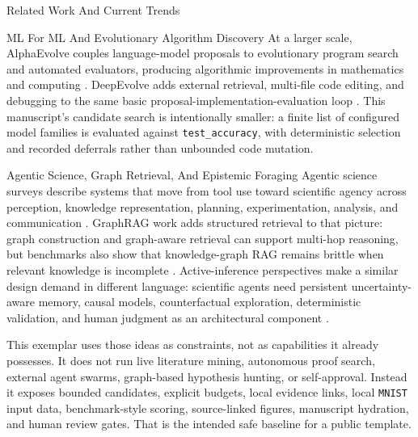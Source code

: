 \documentclass[
  ignorenonframetext,
]{beamer}
\begin{document}
\begin{frame}{Related Work And Current Trends}
\begin{block}{ML For ML And Evolutionary Algorithm Discovery}
At a larger scale, AlphaEvolve couples language-model proposals to
evolutionary program search and automated evaluators, producing
algorithmic improvements in mathematics and computing
. DeepEvolve adds external
retrieval, multi-file code editing, and debugging to the same basic
proposal-implementation-evaluation loop \breakseq{[@deepevolve\_2025]}. This
manuscript's candidate search is intentionally smaller: a finite list of
configured model families is evaluated against \texttt{test\_accuracy},
with deterministic selection and recorded deferrals rather than
unbounded code mutation.
\end{block}

\begin{block}{Agentic Science, Graph Retrieval, And Epistemic Foraging}
\protect{}\label{sec:agentic-science-graph-retrieval}
Agentic science surveys describe systems that move from tool use toward
scientific agency across perception, knowledge representation, planning,
experimentation, analysis, and communication
.
GraphRAG work adds structured retrieval to that picture: graph
construction and graph-aware retrieval can support multi-hop reasoning,
but benchmarks also show that knowledge-graph RAG remains brittle when
relevant knowledge is incomplete . Active-inference perspectives make a similar
design demand in different language: scientific agents need persistent
uncertainty-aware memory, causal models, counterfactual exploration,
deterministic validation, and human judgment as an architectural
component .

This exemplar uses those ideas as constraints, not as capabilities it
already possesses. It does not run live literature mining, autonomous
proof search, external agent swarms, graph-based hypothesis hunting, or
self-approval. Instead it exposes bounded candidates, explicit budgets,
local evidence links, local \texttt{MNIST} input data, benchmark-style
scoring, source-linked figures, manuscript hydration, and human review
gates. That is the intended safe baseline for a public template.
\end{block}


\end{frame}
\end{document}
